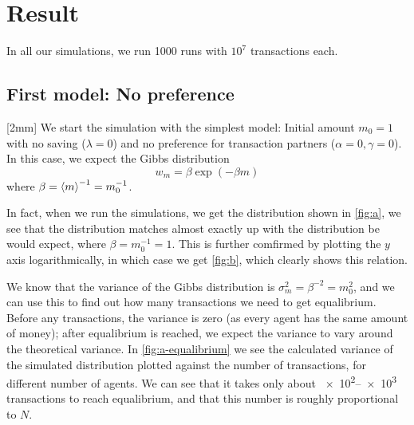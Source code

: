 \documentclass[12pt,a4paper]{article}
\newcommand\oppg[1]{\reversemarginnote{\textcolor{black!40}{#1)}}[2mm]}
\begin{document}
\clearpage

\section{Result}

In all our simulations, we run 1000 runs with $10^7$ transactions each.

\subsection{First model: No preference}

\oppg{a,b}
We start the simulation with the simplest model: Initial amount $m_0 = 1$ with no saving ($\lambda = 0$) and no preference for transaction partners ($\alpha = 0, \gamma = 0$). In this case, we expect the Gibbs distribution
\begin{equation}
  w_m = \beta \exp(-\beta m)
\end{equation}
where $\beta = \expval{m}^{-1} = m_0^{-1}$.

In fact, when we run the simulations, we get the distribution shown in \cref{fig:a}, we see that the distribution matches almost exactly up with the distribution be would expect, where $\beta = m_0^{-1} = 1$. This is further comfirmed by plotting the $y$ axis logarithmically, in which case we get \cref{fig:b}, which clearly shows this relation.

We know that the variance of the Gibbs distribution is $\sigma_m^2 = \beta^{-2} = m_0^2$, and we can use this to find out how many transactions we need to get equalibrium. Before any transactions, the variance is zero (as every agent has the same amount of money); after equalibrium is reached, we expect the variance to vary around the theoretical variance.
In \cref{fig:a-equalibrium} we see the calculated variance of the simulated distribution plotted against the number of transactions, for different number of agents. We can see that it takes only about \numrange{e2}{e3} transactions to reach equalibrium, and that this number is roughly proportional to $N$.
\end{document}
